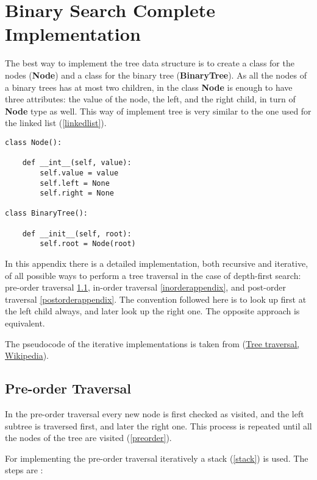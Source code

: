 \chapter{Binary Search Complete Implementation}
\label{binappendix}
The best way to implement the tree data structure is to create a class for the nodes (\textbf{Node}) and a class for the binary tree (\textbf{BinaryTree}). As all the nodes of a binary trees has at most two children, in the class \textbf{Node} is enough to have three attributes: the value of the node, the left, and the right child, in turn of \textbf{Node} type as well. This way of implement tree is very similar to the one used for the \hyperref[linked list]{} linked list (\ref{linkedlist}).

\begin{lstlisting}[firstnumber=1, caption={Class definition for a node and a tree.}]
class Node():

	def __int__(self, value):
		self.value = value
		self.left = None
		self.right = None

class BinaryTree():

	def __init__(self, root):
		self.root = Node(root)
\end{lstlisting}

In this appendix there is a detailed implementation, both recursive and iterative, of all possible ways to perform a tree traversal in the case of depth-first search: pre-order traversal \ref{preorderappendix}, in-order traversal \ref{inorderappendix}, and post-order traversal \ref{postorderappendix}. The convention followed here is to look up first at the left child always, and later look up the right one. The opposite approach is equivalent.

The pseudocode of the iterative implementations is taken from \cite{wikitreestrav}(\href{https://en.wikipedia.org/wiki/Tree_traversal}{Tree traversal, Wikipedia}).

\section{Pre-order Traversal}
\label{preorderappendix}
In the pre-order traversal every new node is first checked as visited, and the left subtree is traversed first, and later the right one. This process is repeated until all the nodes of the tree are visited (\ref{preorder}). 

For implementing the pre-order traversal iteratively a stack (\ref{stack}) is used. The steps are \cite{wikitreestrav}:

